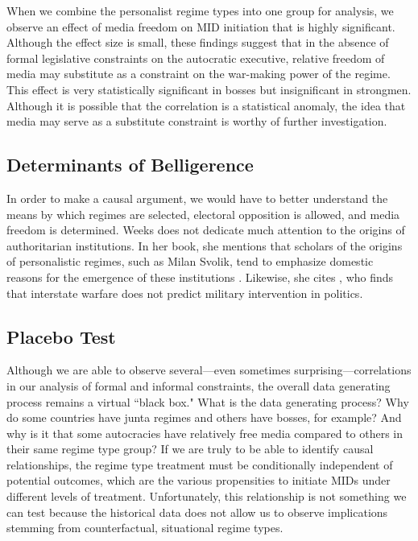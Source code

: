 \documentclass[12pt]{article}
\begin{document}
\par When we combine the personalist regime types into one group for analysis, we observe an effect of media freedom on MID initiation that is highly significant. Although the effect size is small, these findings suggest that in the absence of formal legislative constraints on the autocratic executive, relative freedom of media may substitute as a constraint on the war-making power of the regime. This effect is very statistically significant in bosses but insignificant in strongmen. Although it is possible that the correlation is a statistical anomaly, the idea that media may serve as a substitute constraint is worthy of further investigation.  

\subsection{Determinants of Belligerence}

In order to make a causal argument, we would have to better understand the means by which regimes are selected, electoral opposition is allowed, and media freedom is determined. Weeks does not dedicate much attention to the origins of authoritarian institutions. In her book, she mentions that scholars of the origins of personalistic regimes, such as Milan Svolik, tend to emphasize domestic reasons for the emergence of these institutions \parencite[33--34]{weeks:2014}. Likewise, she cites \cite{svolik:2013}, who finds that interstate warfare does not predict military intervention in politics.  

\subsection{Placebo Test}

\par Although we are able to observe several---even sometimes surprising---correlations in our analysis of formal and informal constraints, the overall data generating process remains a virtual ``black box." What is the data generating process? Why do some countries have junta regimes and others have bosses, for example? And why is it that some autocracies have relatively free media compared to others in their same regime type group? If we are truly to be able to identify causal relationships, the regime type treatment must be conditionally independent of potential outcomes, which are the various propensities to initiate MIDs under different levels of treatment. Unfortunately, this relationship is not something we can test because the historical data does not allow us to observe implications stemming from counterfactual, situational regime types. 
\end{document}
